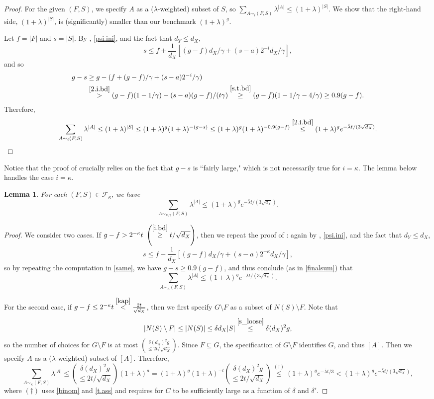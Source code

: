 \documentclass[10pt,a4paper]{amsart}
\newtheorem{lem}[thm]{Lemma}
\theoremstyle{definition}
\newcommand{\gl}{\lambda}
\newcommand{\beq}[1]{\begin{equation}\label{#1}}
\newcommand{\enq}[0]{\end{equation}}
\newcommand{\sub}[0]{\subseteq}
\newcommand{\0}[0]{\emptyset}
\newcommand{\qr}{\gamma}
\begin{document}
\begin{proof}
For the given $(F,S)$, we specify $A$ as a ($\gl$-weighted) subset of $S$, so $\sum_{A \sim_i(F,S)} \gl^{|A|} \le (1+\gl)^{|S|}$. We show that the right-hand side, $(1+\gl)^{|S|}$, is (significantly) smaller than our benchmark $(1+\gl)^g$.

Let $f=|F|$ and $s=|S|.$ By , \eqref{psi.ini}, and the fact that $d_Y\leq d_X$,
\[s \le f+\frac{1}{d_X}[(g-f)d_X/\qr+(s-a)2^{-i}d_X/\qr],\]
and so
\beq{same}\begin{split} g-s &\ge g-(f+(g-f)/\qr+(s-a)2^{-i}/\qr)\\
& \stackrel{\eqref{2.i.bd}}{>} (g-f)(1-1/\qr)-(s-a)(g-f)/(t\qr)\stackrel{\eqref{s.t.bd}}{\ge}(g-f)(1-1/\qr-4/\qr)\ge 0.9(g-f).\end{split}\enq
Therefore,
\beq{finalsum}\sum_{A \sim_i (F, S)} \gl^{|A|} \le (1+\gl)^{|S|} \le (1+\gl)^g(1+\gl)^{-(g-s)} \le (1+\gl)^g(1+\gl)^{-0.9(g-f)}\stackrel{\eqref{2.i.bd}}{\le }(1+\gl)^ge^{-\bar\gl t/(3\sqrt {d_X})}.\enq
\end{proof}

Notice that the proof of  crucially relies on the fact that $g-s$ is ``fairly large," which is not necessarily true for $i=\kappa$. The lemma below handles the case $i=\kappa$.

\begin{lem}\label{lem_large F} For each $(F, S) \in \mathcal{F}_\kappa$, we have
\[\sum_{A \sim_{\kappa, \gamma} (F, S)} \gl^{|A|} \le (1+\gl)^ge^{-\bar\gl t/(3\sqrt{d_X})}.\]
\end{lem}

\begin{proof} We consider two cases. If $g-f>2^{-\kappa}t~\left(\stackrel{\eqref{i.bd}}{\ge} t/\sqrt {d_X} \right)$, then we repeat the proof of : again by , \eqref{psi.ini}, and the fact that $d_Y\leq d_X$,
\[s \le f+\frac{1}{d_X}[(g-f)d_X/\qr+(s-a)2^{-\kappa}d_X/\qr],\]
so by repeating the computation in \eqref{same}, we have $g-s \ge 0.9(g-f)$, and thus conclude (as in \eqref{finalsum}) that
\[\sum_{A \sim_\kappa(F,S)} \gl^{|A|} \le (1+\gl)^ge^{-\bar\gl t/(3\sqrt{d_X})}.\]

For the second case, if $g-f \le 2^{-\kappa} t \stackrel{\eqref{kap}}{<}\frac{2t}{\sqrt{d_X}}$, then we first specify $G \setminus F$ as a subset of $N(S) \setminus F$. Note that 
\[|N(S) \setminus F| \le |N(S)| \le \delta d_X|S| \stackrel{\eqref{s_loose}}{\le} \delta(d_X)^2g,\]
so the number of choices for $G \setminus F$ is at most $\displaystyle {\delta (d_X)^2g \choose \le 2t/\sqrt {d_X}}.$  Since $F \sub G$, the specification of $G \setminus F$ identifies $G$, and thus $[A]$. Then we specify $A$ as a ($\lambda$-weighted) subset of $[A]$. Therefore,
\[\sum_{A \sim_\kappa (F, S)} \gl^{|A|} \le {\delta(d_X)^2 g \choose \le 2t/\sqrt {d_X}} (1+\gl)^a =(1+\gl)^g(1+\gl)^{-t}{\delta(d_X)^2 g \choose \le 2t/\sqrt {d_X}}\stackrel{(\dagger)}{\leq}(1+\gl)^ge^{-\bar\gl t/3}<(1+\gl)^g e^{-\bar\gl t/(3\sqrt{d_X})},\]
where $(\dagger)$ uses \eqref{binom} and \eqref{t.ass} and requires for $C$ to be sufficiently large as a function of $\delta$ and $\delta'$.
\end{proof}
\end{document}
